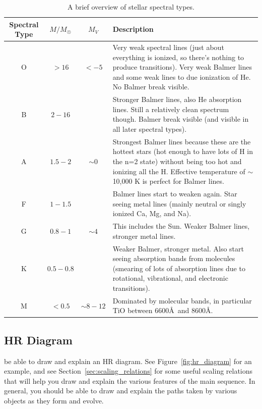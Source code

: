\begin{table}[ht]
\centering
\begin{tabular}{cccp{4in}}
\toprule
Spectral Type & $M / M_\astrosun$ & $M_V$ & Description \\
\midrule
O & $>16$ & $<-5$ &
    Very weak spectral lines (just about everything is ionized, so there's nothing 
    to produce transitions).  Very weak Balmer lines and some weak lines to due 
    ionization of He.  No Balmer break visible. \\
B & $2-16$ &&
    Stronger Balmer lines, also He absorption lines.  Still a relatively clean 
    spectrum though.  Balmer break visible (and visible in all later spectral 
    types). \\
A & $1.5-2$ & $\sim 0$ &
    Strongest Balmer lines because these are the hottest stars (hot enough to have 
    lots of H in the n=2 state) without being too hot and ionizing all the H.  
    Effective temperature of $\sim$10,000 K is perfect for Balmer lines. \\
F & $1-1.5$ &&
    Balmer lines start to weaken again.  Star seeing metal lines (mainly neutral 
    or singly ionized Ca, Mg, and Na). \\
G & $0.8-1$ & $\sim4$ &
    This includes the Sun.  Weaker Balmer lines, stronger metal lines. \\
K & $0.5-0.8$ &&
    Weaker Balmer, stronger metal.  Also start seeing absorption bands from 
    molecules (smearing of lots of absorption lines due to rotational, vibrational, 
    and electronic transitions). \\
M & $<0.5$ & $\sim 8-12$ &
    Dominated by molecular bands, in particular TiO between 6600\AA\ and 8600\AA. \\
\bottomrule
\end{tabular}
\caption{A brief overview of stellar spectral types.}
\label{tab:spectral_types}
\end{table}

\subsection{HR Diagram}
 be able to draw and explain an HR diagram.
See Figure~\ref{fig:hr_diagram} for an example, and see Section~\ref{sec:scaling_relations}
for some useful scaling relations that will help you draw and explain the various
features of the main sequence.  In general, you should be able to draw and explain the paths
taken by various objects as they form and evolve.

